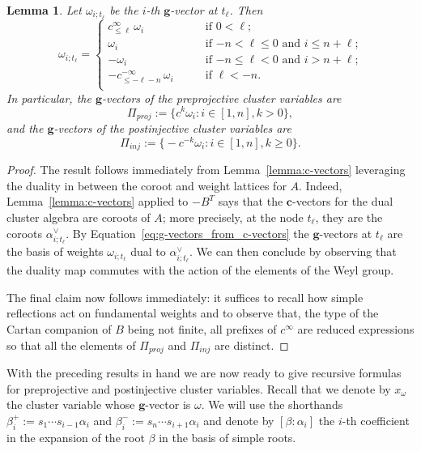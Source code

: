 \documentclass[12pt]{amsart}
\newcommand{\bfc}{\mathbf{c}}
\newcommand{\bfg}{\mathbf{g}}
\newcommand{\cv}{\alpha}
\newcommand{\gv}{\omega}
\newcommand{\Zidx}{\ell}
\newtheorem{lemma}[theorem]{Lemma}
\theoremstyle{remark}
\numberwithin{equation}{section}
\numberwithin{figure}{section}
\begin{document}
\begin{lemma}
  \label{lemma:g-vectors}
  Let $\gv_{i;t_\Zidx}$ be the $i$-th $\bfg$-vector at $t_\Zidx$.
  Then
  \begin{equation}
    \gv_{i;t_\Zidx}
    =
    \begin{cases}
      c^\infty_{\le\Zidx}\, \omega_i & \text{if $0<\Zidx$;}\\
      \omega_i & \text{if $-n < \Zidx \leq 0$ and  $i\leq n+\Zidx$;} \\
      -\omega_i & \text{if $-n\leq \Zidx < 0$ and $i>n+\Zidx$;} \\
      -c^{-\infty}_{\le-\Zidx-n}\, \omega_i \qquad & \text{if $\Zidx <-n$.}\\
    \end{cases}
  \end{equation}
  In particular, the $\bfg$-vectors of the preprojective cluster variables are
  \[
    \Pi_{\textit{proj}}:=\big\{c^k\omega_i: i \in [1,n], k>0\big\},
  \]
  and the $\bfg$-vectors of the postinjective cluster variables are
  \[
  \Pi_{\textit{inj}}:=\big\{-c^{-k}\omega_i: i \in [1,n], k\geq0 \big\}.
  \]
\end{lemma}
\begin{proof}
  The result follows immediately from Lemma~\ref{lemma:c-vectors} leveraging the duality in between the coroot and weight lattices for $A$.
  Indeed, Lemma~\ref{lemma:c-vectors} applied to $-B^T$ says that the $\bfc$-vectors for the dual cluster algebra are coroots of $A$; more precisely, at the node $t_\Zidx$, they are the coroots $\cv_{i;t_\Zidx}^\vee$.
  By Equation~\eqref{eq:g-vectors_from_c-vectors} the $\bfg$-vectors at $t_\Zidx$ are the basis of weights $\gv_{i;t_\Zidx}$ dual to $\cv_{i;t_\Zidx}^\vee$.
  We can then conclude by observing that the duality map commutes with the action of the elements of the Weyl group.

  The final claim now follows immediately: it suffices to recall how simple reflections act on fundamental weights and to observe that, the type of the Cartan companion of $B$ being not finite, all prefixes of $c^\infty$ are reduced expressions so that all the elements of $\Pi_{\textit{proj}}$ and $\Pi_{\textit{inj}}$ are distinct.
\end{proof}

With the preceding results in hand we are now ready to give recursive formulas for preprojective and postinjective cluster variables.
Recall that we denote by $x_\omega$ the cluster variable whose $\bfg$-vector is $\omega$.
We will use the shorthands $\beta_i^+:=s_1\cdots s_{i-1}\alpha_i$ and $\beta_i^-:=s_n\cdots s_{i+1}\alpha_i$ and denote by $[\beta:\alpha_i]$ the $i$-th coefficient in the expansion of the root $\beta$ in the basis of simple roots.
\end{document}
